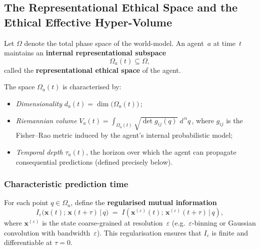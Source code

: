 
\subsection{The Representational Ethical Space and the Ethical Effective Hyper-Volume}
\label{sec:rep-ethical-space}

Let $\Omega$ denote the total phase space of the world-model.  
An agent~$a$ at time~$t$ maintains an \textbf{internal representational subspace}
\begin{equation}
    \Omega_a(t) \subseteq \Omega,
\end{equation}
called the \textbf{representational ethical space} of the agent.

The space $\Omega_a(t)$ is characterised by:
\begin{itemize}
    \item \emph{Dimensionality}\; $d_a(t)=\dim\bigl(\Omega_a(t)\bigr)$\,;
    \item \emph{Riemannian volume}\; $V_a(t)=\int_{\Omega_a(t)}\!\sqrt{\det g_{ij}(q)}\;d^{\,n}q$\,,
          where $g_{ij}$ is the Fisher--Rao metric induced by the agent's internal probabilistic model;
    \item \emph{Temporal depth}\; $\tau_a(t)$, the horizon over which the agent can propagate
          consequential predictions (defined precisely below).
\end{itemize}

\subsubsection{Characteristic prediction time}
\label{sec:tau-char}

For each point $q\in\Omega_a$, define the \textbf{regularised mutual information}
\begin{equation}
    I_\varepsilon\bigl(\mathbf{x}(t);\,\mathbf{x}(t+\tau)\,\big|\,q\bigr)
    \;=\;
    I\!\left(\mathbf{x}^{(\varepsilon)}(t);\,\mathbf{x}^{(\varepsilon)}(t+\tau)\,\Big|\,q\right),
\end{equation}
where $\mathbf{x}^{(\varepsilon)}$ is the state coarse-grained at resolution~$\varepsilon$
(e.g.\ $\varepsilon$-binning or Gaussian convolution with bandwidth~$\varepsilon$).
This regularisation ensures that $I_\varepsilon$ is finite and differentiable at $\tau=0$.

